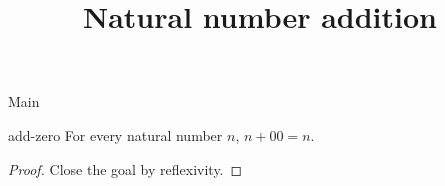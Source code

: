 \begin{lexlean}{Main}
\title{Natural number addition}

\begin{theorem}{add-zero}
\noaxioms
For every natural number \(n\), \(n + 00 = n\).
\begin{proof}
Close the goal by reflexivity.
\end{proof}
\end{theorem}
\end{lexlean}
